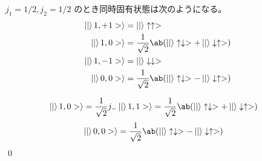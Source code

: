 \documentclass[uplatex,dvipdfmx,a4paper,11pt]{jlreq}
\makeatletter
\numberwithin{equation}{section}
\theoremstyle{definition}
\renewenvironment{proof}[1][\proofname]{\par
  \normalfont
  \topsep6\p@\@plus6\p@ \trivlist
  \item[\hskip\labelsep{\bfseries #1}\@addpunct{\bfseries}]\ignorespaces\quad\par
}{%
  \qed\endtrivlist\@endpefalse
}
\renewcommand\proofname{証明}
\makeatother
\begin{document}
\begin{proposition}
  $j_1 = 1/2, j_2 = 1/2$ のとき同時固有状態は次のようになる。
  \begin{align}
    \ket|1, +1>\rangle & = \ket|\uparrow\uparrow>                                                     \\
    \ket|1, 0>\rangle  & = \frac{1}{\sqrt{2}}\ab(\ket|\uparrow\downarrow> + \ket|\downarrow\uparrow>) \\
    \ket|1, -1>\rangle & = \ket|\downarrow\downarrow>                                                 \\
    \ket|0, 0>\rangle  & = \frac{1}{\sqrt{2}}\ab(\ket|\uparrow\downarrow> - \ket|\downarrow\uparrow>)
  \end{align}
\end{proposition}
\begin{proof}

  \begin{align}
    \ket|1, 0>\rangle & = \frac{1}{\sqrt{2}}j_-\ket|1, 1>\rangle = \frac{1}{\sqrt{2}}\ab(\ket|\uparrow\downarrow> + \ket|\downarrow\uparrow>)
  \end{align}
  \begin{align}
    \ket|0, 0>\rangle & = \frac{1}{\sqrt{2}}\ab(\ket|\uparrow\downarrow> - \ket|\downarrow\uparrow>)
  \end{align}
\end{proof}
\end{document}
